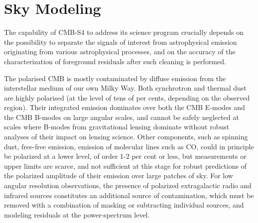 
%
%

\section{Sky Modeling}
\label{sec:skymodel}

The capability of CMB-S4 to address its science program crucially depends on the possibility to separate the signals of interest from astrophysical emission originating from various astrophysical processes, and on the accuracy of the characterization of foreground residuals after such cleaning is performed. 

The polarised CMB is mostly contaminated by diffuse emission from the interstellar medium of our own Milky Way. Both synchrotron and thermal dust are highly polarised (at the level of tens of per cents, depending on the observed region). Their integrated emission dominates over both the CMB E-modes and the CMB B-modes on large angular scales, and cannot be safely neglected at scales where B-modes from gravitational lensing dominate without robust analyses of their impact on lensing science. Other components, such as spinning dust, free-free emission, emission of molecular lines such as CO, could in principle be polarized at a lower level, of order 1-2 per cent or less, but measurements or upper limits are scarce, and not sufficient at this stage for robust predictions of the polarized amplitude of their emission over large patches of sky. For low angular resolution observations, the presence of polarized extragalactic radio and infrared sources constitutes an additional source of contamination, which must be removed with a combination of masking or subtracting individual sources, and modeling residuals at the power-spectrum level.

